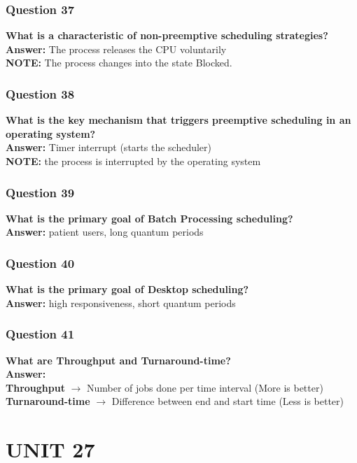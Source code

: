 \documentclass{article}
\begin{document}
\subsubsection*{Question 37}
\textbf{What is a characteristic of non-preemptive scheduling strategies?} \\
\textbf{Answer:} The process releases the CPU voluntarily \\
\textbf{NOTE:} The process changes into the state Blocked.

\subsubsection*{Question 38}
\textbf{What is the key mechanism that triggers preemptive scheduling in an operating system?} \\
\textbf{Answer:} Timer interrupt (starts the scheduler) \\
\textbf{NOTE:} the process is interrupted by the operating system

\subsubsection*{Question 39}
\textbf{What is the primary goal of Batch Processing scheduling?} \\
\textbf{Answer:} patient users, long quantum periods \\

\subsubsection*{Question 40}
\textbf{What is the primary goal of Desktop scheduling?} \\
\textbf{Answer:} high responsiveness, short quantum periods \\

\subsubsection*{Question 41}
\textbf{What are Throughput and Turnaround-time?} \\
\textbf{Answer:}\\ 
\textbf{Throughput} $\rightarrow$ Number of jobs done per time interval (More is better) \\
\textbf{Turnaround-time} $\rightarrow$ Difference between end and start time (Less is better)

\section*{UNIT 27}
\end{document}
